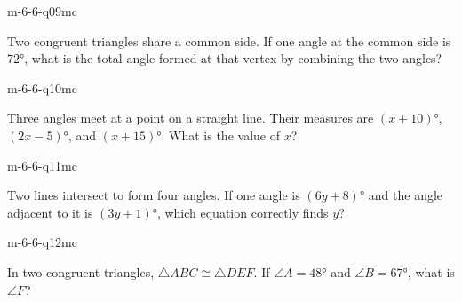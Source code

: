 \begin{practiceQuestion}{m-6-6-q09}{mc}
\begin{questionText}
Two congruent triangles share a common side. If one angle at the common side is $72°$, what is the total angle formed at that vertex by combining the two angles?
\end{questionText}
\end{practiceQuestion}

\begin{practiceQuestion}{m-6-6-q10}{mc}
\begin{questionText}
Three angles meet at a point on a straight line. Their measures are $(x + 10)°$, $(2x - 5)°$, and $(x + 15)°$. What is the value of $x$?
\end{questionText}
\end{practiceQuestion}

\begin{practiceQuestion}{m-6-6-q11}{mc}
\begin{questionText}
Two lines intersect to form four angles. If one angle is $(6y + 8)°$ and the angle adjacent to it is $(3y + 1)°$, which equation correctly finds $y$?
\end{questionText}
\end{practiceQuestion}

\begin{practiceQuestion}{m-6-6-q12}{mc}
\begin{questionText}
In two congruent triangles, $\triangle ABC \cong \triangle DEF$. If $\angle A = 48°$ and $\angle B = 67°$, what is $\angle F$?
\end{questionText}
\end{practiceQuestion}

